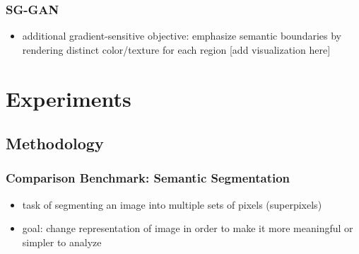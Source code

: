 \documentclass{beamer}
\begin{document}
\begin{frame}
\frametitle{SG-GAN}
\begin{itemize}
	\item additional gradient-sensitive objective: emphasize semantic boundaries by rendering distinct color/texture for each region
	[add visualization here]
\end{itemize}
\end{frame}

\section{Experiments}

\subsection{Methodology}

\begin{frame}
\frametitle{Comparison Benchmark: Semantic Segmentation}
\begin{itemize}
	\item task of segmenting an image into multiple sets of pixels (superpixels)
	\item goal: change representation of image in order to make it more meaningful or simpler to analyze
\end{itemize}
\end{frame}
\end{document}
